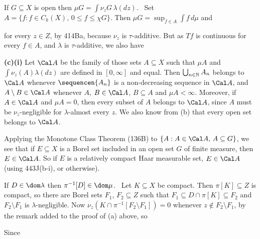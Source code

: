 {\medskip

 If $G\subseteq X$ is open then
$\mu G=\int\nu_zG\,\lambda(dz)$.   \Prf\ Set
$A=\{f:f\in C_k(X),\,0\le f\le\chi G\}$.   Then
$\mu G=\sup_{f\in A}\int f\,d\mu$ and


\noindent for every $z\in Z$, by 414Ba, because $\nu_z$ is
$\tau$-additive.   But as $Tf$ is continuous
for every $f\in A$, and $\lambda$ is $\tau$-additive, we also have


\medskip

{\bf (c)(i)} Let $\Cal A$ be the family of those sets $A\subseteq X$
such that $\mu A$ and $\int\nu_z(A)\lambda(dz)$ are defined in
$[0,\infty]$ and equal.   Then $\bigcup_{n\in\Bbb N}A_n$ belongs to
$\Cal A$ whenever $\sequencen{A_n}$ is a non-decreasing sequence in
$\Cal A$, and $A\setminus B\in\Cal A$ whenever $A$, $B\in\Cal A$,
$B\subseteq A$ and $\mu A<\infty$.   Moreover, if $A\in\Cal A$ and
$\mu A=0$, then every subset of $A$ belongs to $\Cal A$, since $A$ must
be $\nu_z$-negligible for $\lambda$-almost every $z$.   We also know
from (b) that every open set belongs to $\Cal A$.

Applying the Monotone Class Theorem (136B) to
$\{A:A\in\Cal A,\,A\subseteq G\}$, we see that if $E\subseteq X$ is a
Borel set
included in an open set $G$ of finite measure, then $E\in\Cal A$.   So
if $E$ is a relatively compact Haar measurable set, $E\in\Cal A$ (using
443J(b-i), or otherwise).

\medskip

 If $D\in\dom\lambda$ then $\pi^{-1}[D]\in\dom\mu$.
\Prf\ Let $K\subseteq X$ be compact.   Then $\pi[K]\subseteq Z$ is
compact, so there are Borel sets $F_1$, $F_2\subseteq Z$ such that
$F_1\subseteq D\cap\pi[K]\subseteq F_2$ and $F_2\setminus F_1$ is
$\lambda$-negligible.   Now
$\nu_z(K\cap\pi^{-1}[F_2\setminus F_1])=0$ whenever
$z\notin F_2\setminus F_1$, by the remark added to the proof of (a)
above, so


\noindent Since


}
